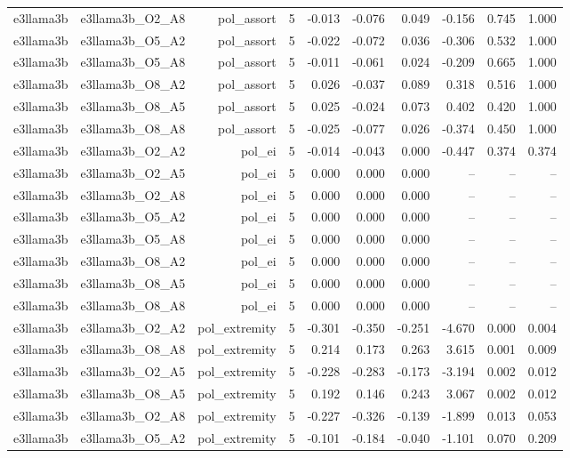 \documentclass[11pt]{article}
\begin{document}
\begin{landscape}
\begin{longtable}{@{}lrrrrrrrrr@{}}
e3llama3b & e3llama3b\_O2\_A8 & pol\_assort & 5 & -0.013 & -0.076 & 0.049 & -0.156 & 0.745 & 1.000 \\
e3llama3b & e3llama3b\_O5\_A2 & pol\_assort & 5 & -0.022 & -0.072 & 0.036 & -0.306 & 0.532 & 1.000 \\
e3llama3b & e3llama3b\_O5\_A8 & pol\_assort & 5 & -0.011 & -0.061 & 0.024 & -0.209 & 0.665 & 1.000 \\
e3llama3b & e3llama3b\_O8\_A2 & pol\_assort & 5 & 0.026 & -0.037 & 0.089 & 0.318 & 0.516 & 1.000 \\
e3llama3b & e3llama3b\_O8\_A5 & pol\_assort & 5 & 0.025 & -0.024 & 0.073 & 0.402 & 0.420 & 1.000 \\
e3llama3b & e3llama3b\_O8\_A8 & pol\_assort & 5 & -0.025 & -0.077 & 0.026 & -0.374 & 0.450 & 1.000 \\
e3llama3b & e3llama3b\_O2\_A2 & pol\_ei & 5 & -0.014 & -0.043 & 0.000 & -0.447 & 0.374 & 0.374 \\
e3llama3b & e3llama3b\_O2\_A5 & pol\_ei & 5 & 0.000 & 0.000 & 0.000 & -- & -- & -- \\
e3llama3b & e3llama3b\_O2\_A8 & pol\_ei & 5 & 0.000 & 0.000 & 0.000 & -- & -- & -- \\
e3llama3b & e3llama3b\_O5\_A2 & pol\_ei & 5 & 0.000 & 0.000 & 0.000 & -- & -- & -- \\
e3llama3b & e3llama3b\_O5\_A8 & pol\_ei & 5 & 0.000 & 0.000 & 0.000 & -- & -- & -- \\
e3llama3b & e3llama3b\_O8\_A2 & pol\_ei & 5 & 0.000 & 0.000 & 0.000 & -- & -- & -- \\
e3llama3b & e3llama3b\_O8\_A5 & pol\_ei & 5 & 0.000 & 0.000 & 0.000 & -- & -- & -- \\
e3llama3b & e3llama3b\_O8\_A8 & pol\_ei & 5 & 0.000 & 0.000 & 0.000 & -- & -- & -- \\
e3llama3b & e3llama3b\_O2\_A2 & pol\_extremity & 5 & -0.301 & -0.350 & -0.251 & -4.670 & 0.000 & 0.004 \\
e3llama3b & e3llama3b\_O8\_A8 & pol\_extremity & 5 & 0.214 & 0.173 & 0.263 & 3.615 & 0.001 & 0.009 \\
e3llama3b & e3llama3b\_O2\_A5 & pol\_extremity & 5 & -0.228 & -0.283 & -0.173 & -3.194 & 0.002 & 0.012 \\
e3llama3b & e3llama3b\_O8\_A5 & pol\_extremity & 5 & 0.192 & 0.146 & 0.243 & 3.067 & 0.002 & 0.012 \\
e3llama3b & e3llama3b\_O2\_A8 & pol\_extremity & 5 & -0.227 & -0.326 & -0.139 & -1.899 & 0.013 & 0.053 \\
e3llama3b & e3llama3b\_O5\_A2 & pol\_extremity & 5 & -0.101 & -0.184 & -0.040 & -1.101 & 0.070 & 0.209 \\

\end{longtable}
\end{landscape}
\end{document}
